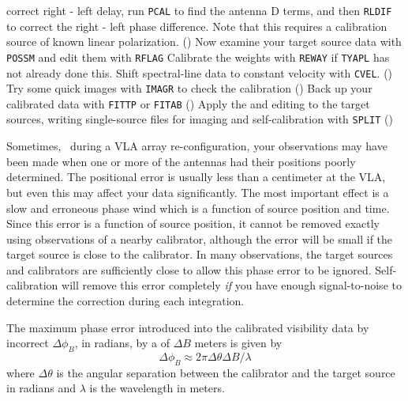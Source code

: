       correct right - left delay, run {\tt PCAL} to find the antenna D
      terms, and then {\tt RLDIF} to correct the right - left phase
      difference.  Note that this requires a calibration source of
      known linear polarization. ()
\Item Now examine your target source data with {\tt POSSM} and edit
      them with {\tt RFLAG}
\Item Calibrate the weights with {\tt REWAY} if {\tt TYAPL} has not
      already done this.  Shift spectral-line data to constant
      velocity with {\tt CVEL}\@. ()
\Item Try some quick images with {\tt IMAGR} to check the calibration
      ()
\Item Back up your calibrated data with {\tt FITTP} or {\tt FITAB}
      ()
\Item Apply the  and editing to the target sources,
      writing single-source files for imaging and self-calibration
      with {\tt SPLIT} ()
\xeen


     Sometimes, \eg\ during a VLA array re-configuration, your
observations may have been made when one or more of the antennas had
their positions poorly determined.  The positional error is usually
less than a centimeter at the VLA, but even this may affect your data
significantly.  The most important effect is a slow and erroneous
phase wind which is a function of source position and time.  Since
this error is a function of source position, it cannot be removed
exactly using observations of a nearby calibrator, although the error
will be small if the target source is close to the calibrator.  In
many observations, the target sources and calibrators are sufficiently
close to allow this phase error to be ignored.  Self-calibration will
remove this error completely {\it if\/} you have enough
signal-to-noise to determine the correction during each integration.

    The maximum phase error introduced into the calibrated visibility
data by incorrect  $\Delta\phi_{B}$, in
radians, by a  of $\Delta B$ meters is given by
    $$\Delta\phi_{B} \approx 2\pi\Delta\theta\Delta B / \lambda$$
where $\Delta\theta$ is the angular separation between the calibrator
and the target source in radians and $\lambda$ is the wavelength in
meters.

